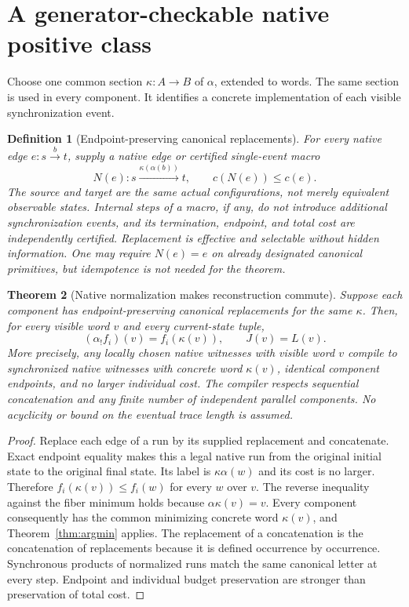 \documentclass[11pt]{article}
\newtheorem{theorem}{Theorem}[section]
\newtheorem{definition}[theorem]{Definition}
\begin{document}
\section{A generator-checkable native positive class}
Choose one common section $\kappa:A\to B$ of $\alpha$, extended to words. The same section is used in every component. It identifies a concrete implementation of each visible synchronization event.

\begin{definition}[Endpoint-preserving canonical replacements]
For every native edge $e:s\xrightarrow{b}t$, supply a native edge or certified single-event macro
\[
 N(e):s\xrightarrow{\kappa(\alpha(b))}t,
 \qquad c(N(e))\leq c(e).
\]
The source and target are the \emph{same actual configurations}, not merely equivalent observable states. Internal steps of a macro, if any, do not introduce additional synchronization events, and its termination, endpoint, and total cost are independently certified. Replacement is effective and selectable without hidden information. One may require $N(e)=e$ on already designated canonical primitives, but idempotence is not needed for the theorem.
\end{definition}

\begin{theorem}[Native normalization makes reconstruction commute]\label{thm:normal}
Suppose each component has endpoint-preserving canonical replacements for the same $\kappa$. Then, for every visible word $v$ and every current-state tuple,
\[
 (\alpha_!f_i)(v)=f_i(\kappa(v)),\qquad J(v)=L(v).
\]
More precisely, any locally chosen native witnesses with visible word $v$ compile to synchronized native witnesses with concrete word $\kappa(v)$, identical component endpoints, and no larger individual cost. The compiler respects sequential concatenation and any finite number of independent parallel components. No acyclicity or bound on the eventual trace length is assumed.
\end{theorem}
\begin{proof}
Replace each edge of a run by its supplied replacement and concatenate. Exact endpoint equality makes this a legal native run from the original initial state to the original final state. Its label is $\kappa\alpha(w)$ and its cost is no larger. Therefore $f_i(\kappa(v))\leq f_i(w)$ for every $w$ over $v$. The reverse inequality against the fiber minimum holds because $\alpha\kappa(v)=v$. Every component consequently has the common minimizing concrete word $\kappa(v)$, and Theorem~\ref{thm:argmin} applies. The replacement of a concatenation is the concatenation of replacements because it is defined occurrence by occurrence. Synchronous products of normalized runs match the same canonical letter at every step. Endpoint and individual budget preservation are stronger than preservation of total cost.
\end{proof}
\end{document}
